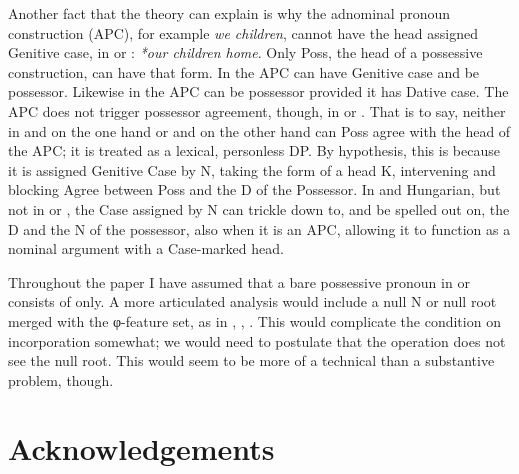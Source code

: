 \documentclass[output=paper]{langsci/langscibook}
\begin{document}
Another fact that the theory can explain is why the adnominal pronoun
construction (\gls{APC}), for example
\emph{we children}, cannot have the head assigned Genitive
case, in  or : \emph{*our children home}. Only Poss, the head of
a possessive construction, can have that form. In  the APC can have
Genitive case and be possessor. Likewise in  the
\gls{APC} can be possessor provided it has
Dative case. The \gls{APC} does not trigger
possessor agreement, though, in  or . That is to say, neither
in  and  on the one hand or  and  on the other
hand can Poss agree with the head of the APC; it is treated as a lexical,
personless DP. By hypothesis, this is because it is assigned
Genitive Case by N, taking the form of a head K, intervening
and blocking Agree between Poss and the D of the Possessor. In  and
Hungarian, but not in  or , the Case assigned by N can trickle
down to, and be spelled out on, the D and the N of the possessor, also when it
is an \gls{APC}, allowing it to function as
a nominal argument with a Case-marked head.

Throughout the paper I have assumed that a bare possessive pronoun in 
or  consists of  only. A more articulated analysis would
include a null N or null root merged with the φ-feature set, as in
\citet{Panagiotidis2002}, \citet{Elbourne2008}, \citet{HolmbergPhimsawat2017}.
This would complicate the condition on incorporation somewhat; we would need to
postulate that the  operation does not see the null root. This
would seem to be more of a technical than a substantive problem, though.

\printchapterglossary{}

\section*{Acknowledgements}
\end{document}

